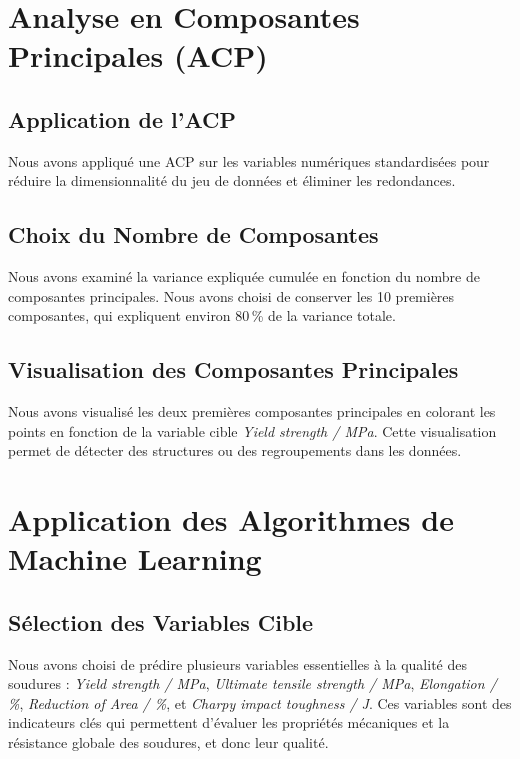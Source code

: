 \documentclass{article}
\begin{document}
\section{Analyse en Composantes Principales (ACP)}

\subsection{Application de l'ACP}

Nous avons appliqué une ACP sur les variables numériques standardisées pour réduire la dimensionnalité du jeu de données et éliminer les redondances.

\subsection{Choix du Nombre de Composantes}

Nous avons examiné la variance expliquée cumulée en fonction du nombre de composantes principales. Nous avons choisi de conserver les 10 premières composantes, qui expliquent environ 80\,\% de la variance totale.

\subsection{Visualisation des Composantes Principales}

Nous avons visualisé les deux premières composantes principales en colorant les points en fonction de la variable cible \textit{Yield strength / MPa}. Cette visualisation permet de détecter des structures ou des regroupements dans les données.

\section{Application des Algorithmes de Machine Learning}

\subsection{Sélection des Variables Cible}

Nous avons choisi de prédire plusieurs variables essentielles à la qualité des soudures : \textit{Yield strength / MPa}, \textit{Ultimate tensile strength / MPa}, \textit{Elongation / \%}, \textit{Reduction of Area / \%}, et \textit{Charpy impact toughness / J}. Ces variables sont des indicateurs clés qui permettent d’évaluer les propriétés mécaniques et la résistance globale des soudures, et donc leur qualité.
\end{document}
